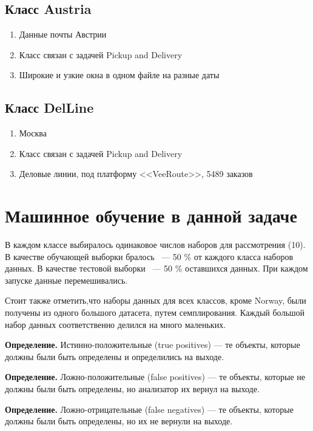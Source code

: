 \subsection{Класс Austria}

\begin{enumerate}
	\item Данные почты Австрии
	\item Класс связан с задачей Pickup and Delivery
	\item Широкие и узкие окна в одном файле на разные даты
\end{enumerate}

\subsection{Класс DelLine}

\begin{enumerate}
	\item Москва
	\item Класс связан с задачей Pickup and Delivery
	\item Деловые линии, под платформу <<VeeRoute>>, 5489 заказов
\end{enumerate}


\section{Машинное обучение в данной задаче}

В каждом классе выбиралось одинаковое числов наборов для рассмотрения (10).
В качестве обучающей выборки бралось ~--- 50 \% от каждого класса наборов данных.
В качестве тестовой выборки ~--- 50 \% оставшихся данных.
При каждом запуске данные перемешивались.

Стоит также отметить,что наборы данных для всех классов, кроме Norway, были получены из одного большого датасета, путем семплирования.
Каждый большой набор данных соответственно делился на много маленьких.

\textbf{Определение.} Истинно-положительные (true positives) --- те объекты, которые должны были быть определены и определились на выходе.

\textbf{Определение.} Ложно-положительные (false positives) --- те объекты, которые не должны были быть определены, но анализатор их вернул на выходе.

\textbf{Определение.} Ложно-отрицательные (false negatives) --- те объекты, которые должны были быть определены, но их не вернули на выходе.

